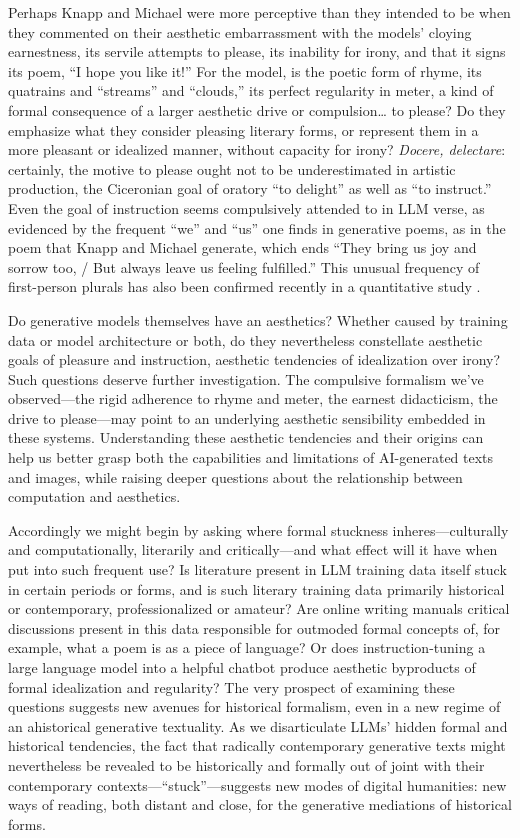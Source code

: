 \documentclass{simple-humanities}         %
\begin{document}
Perhaps Knapp and Michael were more perceptive than they intended to be when they commented on their aesthetic embarrassment with the models' cloying earnestness, its servile attempts to please, its inability for irony, and that it signs its poem, ``I hope you like it!''
For the model, is the poetic form of rhyme, its quatrains and ``streams'' and ``clouds,'' its perfect regularity in meter, a kind of formal consequence of a larger aesthetic drive or compulsion\ldots{} to please?
Do they emphasize what they consider pleasing literary forms, or represent them in a more pleasant or idealized manner, without capacity for irony?
\emph{Docere, delectare}: certainly, the motive to please ought not to be underestimated in artistic production, the Ciceronian goal of oratory ``to delight'' as well as ``to instruct.''
Even the goal of instruction seems compulsively attended to in LLM verse, as evidenced by the frequent ``we'' and ``us'' one finds in generative poems, as in the poem that Knapp and Michael generate, which ends ``They bring us joy and sorrow too, / But always leave us feeling fulfilled.''
This unusual frequency of first-person plurals has also been confirmed recently in a quantitative study \parencite{walshSonnetNotBot2024}.

Do generative models themselves have an aesthetics?
Whether caused by training data or model architecture or both, do they nevertheless constellate aesthetic goals of pleasure and instruction, aesthetic tendencies of idealization over irony?
Such questions deserve further investigation.
The compulsive formalism we've observed---the rigid adherence to rhyme and meter, the earnest didacticism, the drive to please---may point to an underlying aesthetic sensibility embedded in these systems.
Understanding these aesthetic tendencies and their origins can help us better grasp both the capabilities and limitations of AI-generated texts and images, while raising deeper questions about the relationship between computation and aesthetics.

Accordingly we might begin by asking where formal stuckness inheres---culturally and computationally, literarily and critically---and what effect will it have when put into such frequent use?
Is literature present in LLM training data itself stuck in certain periods or forms, and is such literary training data primarily historical or contemporary, professionalized or amateur?
Are online writing manuals critical discussions present in this data responsible for outmoded formal concepts of, for example, what a poem is as a piece of language?
Or does instruction-tuning a large language model into a helpful chatbot produce aesthetic byproducts of formal idealization and regularity?
The very prospect of examining these questions suggests new avenues for historical formalism, even in a new regime of an ahistorical generative textuality.
As we disarticulate LLMs' hidden formal and historical tendencies, the fact that radically contemporary generative texts might nevertheless be revealed to be historically and formally out of joint with their contemporary contexts---``stuck''---suggests new modes of digital humanities: new ways of reading, both distant and close, for the generative mediations of historical forms.
\end{document}
